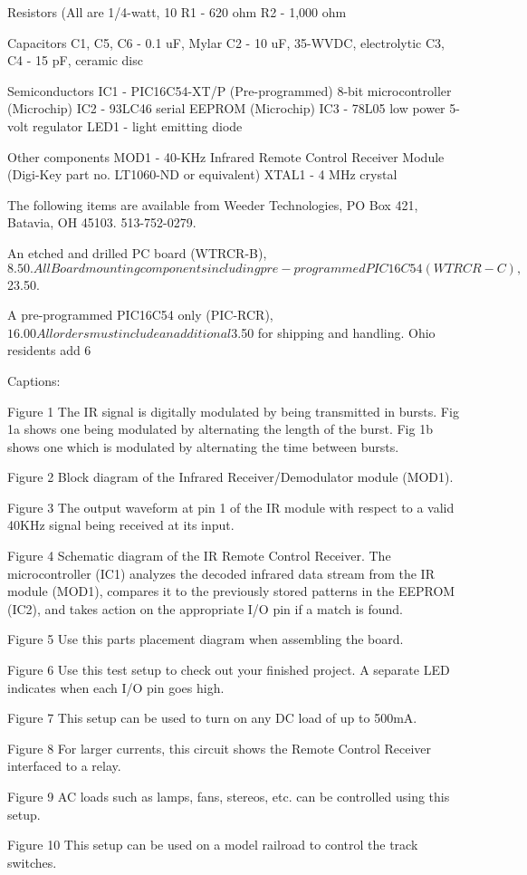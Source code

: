 Resistors (All are 1/4-watt, 10%
R1 - 620 ohm
R2 - 1,000 ohm

Capacitors
C1, C5, C6 - 0.1 uF, Mylar
C2 - 10 uF, 35-WVDC, electrolytic
C3, C4 - 15 pF, ceramic disc

Semiconductors
IC1 - PIC16C54-XT/P (Pre-programmed) 8-bit microcontroller
(Microchip)
IC2 - 93LC46 serial EEPROM (Microchip)
IC3 - 78L05 low power 5-volt regulator
LED1 - light emitting diode

Other components
MOD1 - 40-KHz Infrared Remote Control Receiver Module (Digi-Key part
no. LT1060-ND or equivalent)
XTAL1 - 4 MHz crystal



The following items are available from Weeder Technologies, PO Box
421, Batavia, OH 45103. 513-752-0279.

  An etched and drilled PC board (WTRCR-B), $8.50.
  
  All Board mounting components including pre-programmed PIC16C54
  (WTRCR-C), $23.50.
  
  A pre-programmed PIC16C54 only (PIC-RCR), $16.00
  
All orders must include an additional $3.50 for shipping and
handling. Ohio residents add 6%


Captions:

Figure 1
  The IR signal is digitally modulated by being transmitted in
  bursts. Fig 1a shows one being modulated by alternating the length
  of the burst. Fig 1b shows one which is modulated by alternating
  the time between bursts.

Figure 2
  Block diagram of the Infrared Receiver/Demodulator module (MOD1).
  
Figure 3
  The output waveform at pin 1 of the IR module with respect to a
  valid 40KHz signal being received at its input.
  
Figure 4
  Schematic diagram of the IR Remote Control Receiver. The
  microcontroller (IC1) analyzes the decoded infrared data stream
  from the IR module (MOD1), compares it to the previously stored
  patterns in the EEPROM (IC2), and takes action on the appropriate
  I/O pin if a match is found.
  
Figure 5
  Use this parts placement diagram when assembling the board.
  
Figure 6
  Use this test setup to check out your finished project. A separate
  LED indicates when each I/O pin goes high.
  
Figure 7
  This setup can be used to turn on any DC load of up to 500mA.
  
Figure 8
  For larger currents, this circuit shows the Remote Control Receiver
  interfaced to a relay.
  
Figure 9
  AC loads such as lamps, fans, stereos, etc. can be controlled using
  this setup.
  
Figure 10
  This setup can be used on a model railroad to control the track
  switches.